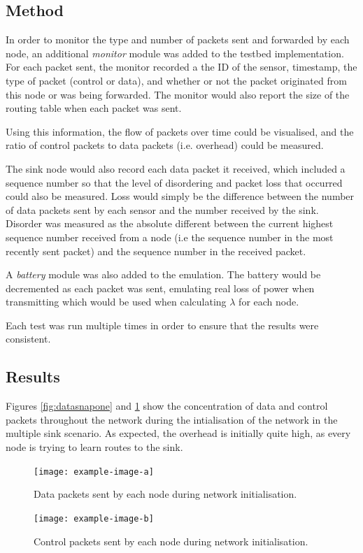 \documentclass[12pt]{article}
\begin{document}
\subsection{Method}

In order to monitor the type and number of packets sent and forwarded by each node, an additional \emph{monitor} module was added to the testbed implementation. For each packet sent, the monitor recorded a the ID of the sensor, timestamp, the type of packet (control or data), and whether or not the packet originated from this node or was being forwarded. The monitor would also report the size of the routing table when each packet was sent. 

Using this information, the flow of packets over time could be visualised, and the ratio of control packets to data packets (i.e. overhead) could be measured. 

The sink node would also record each data packet it received, which included a sequence number so that the level of disordering and packet loss that occurred could also be measured. Loss would simply be the difference between the number of data packets sent by each sensor and the number received by the sink. Disorder was measured as the absolute different between the current highest sequence number received from a node (i.e the sequence number in the most recently sent packet) and the sequence number in the received packet.

A \emph{battery} module was also added to the emulation. The battery would be decremented as each packet was sent, emulating real loss of power when transmitting which would be used when calculating $\lambda$ for each node.

Each test was run multiple times in order to ensure that the results were consistent.

\subsection{Results}

Figures \ref{fig:datasnapone} and \ref{fig:ctrlsnapone} show the concentration of data and control packets throughout the network during the intialisation of the network in the multiple sink scenario. As expected, the overhead is initially quite high, as every node is trying to learn routes to the sink. 

\begin{figure}[!ht]
    \centering
    \begin{minipage}{0.45\textwidth}
        \centering
        \texttt{[image: example-image-a]} %
        \caption{Data packets sent by each node during network initialisation.}
        \label{fig:datasnapone}
    \end{minipage}\hfill
    \begin{minipage}{0.45\textwidth}
        \centering
        \texttt{[image: example-image-b]} %
        \caption{Control packets sent by each node during network initialisation.}
        \label{fig:ctrlsnapone}
    \end{minipage}
\end{figure}
\end{document}
